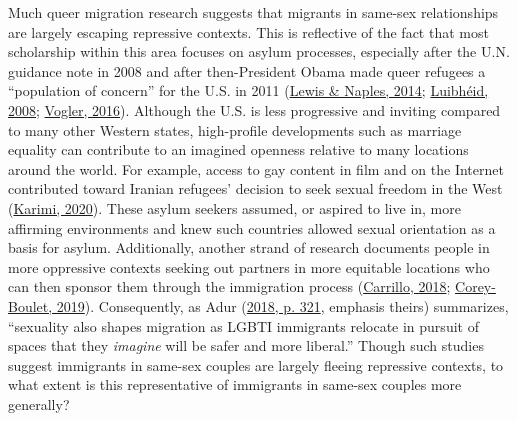 \documentclass[
  12pt,
]{article}
\begin{document}
Much queer migration research suggests that migrants in same-sex relationships are largely escaping repressive contexts. This is reflective of the fact that most scholarship within this area focuses on asylum processes, especially after the U.N. guidance note in 2008 and after then-President Obama made queer refugees a ``population of concern'' for the U.S. in 2011 (\protect\hyperlink{ref-lewis_2014}{Lewis \& Naples, 2014}; \protect\hyperlink{ref-luibheid_2008}{Luibhéid, 2008}; \protect\hyperlink{ref-vogler_2016}{Vogler, 2016}). Although the U.S. is less progressive and inviting compared to many other Western states, high-profile developments such as marriage equality can contribute to an imagined openness relative to many locations around the world. For example, access to gay content in film and on the Internet contributed toward Iranian refugees' decision to seek sexual freedom in the West (\protect\hyperlink{ref-karimi_2020}{Karimi, 2020}). These asylum seekers assumed, or aspired to live in, more affirming environments and knew such countries allowed sexual orientation as a basis for asylum. Additionally, another strand of research documents people in more oppressive contexts seeking out partners in more equitable locations who can then sponsor them through the immigration process (\protect\hyperlink{ref-carrillo_2018}{Carrillo, 2018}; \protect\hyperlink{ref-corey-boulet_2019}{Corey-Boulet, 2019}). Consequently, as Adur (\protect\hyperlink{ref-adur_2018}{2018, p. 321}, emphasis theirs) summarizes, ``sexuality also shapes migration as LGBTI immigrants relocate in pursuit of spaces that they \emph{imagine} will be safer and more liberal.'' Though such studies suggest immigrants in same-sex couples are largely fleeing repressive contexts, to what extent is this representative of immigrants in same-sex couples more generally?
\end{document}
